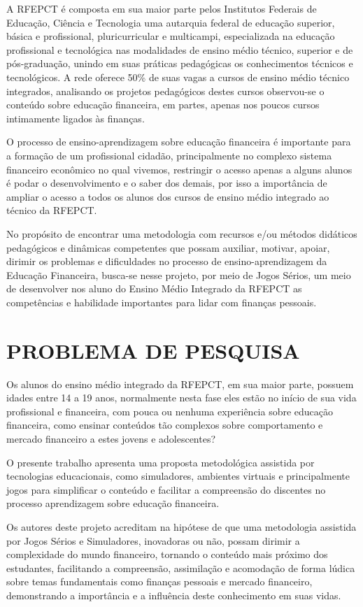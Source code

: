 A RFEPCT é composta em sua maior parte pelos Institutos Federais de Educação, Ciência e Tecnologia uma autarquia federal de educação superior, básica e profissional, pluricurricular e multicampi, especializada na educação profissional e tecnológica nas modalidades de ensino médio técnico, superior e de pós-graduação, unindo em suas práticas pedagógicas os conhecimentos técnicos e tecnológicos. A rede oferece 50\% de suas vagas a cursos de ensino médio técnico integrados, analisando os projetos pedagógicos destes cursos observou-se o conteúdo sobre educação financeira, em partes, apenas nos poucos cursos intimamente ligados às finanças.

O processo de ensino-aprendizagem sobre educação financeira é importante para a formação de um profissional cidadão, principalmente no complexo sistema financeiro econômico no qual vivemos, restringir o acesso apenas a alguns alunos é podar o desenvolvimento e o saber dos demais, por isso a importância de ampliar o acesso a todos os alunos dos cursos de ensino médio integrado ao técnico da RFEPCT.

No propósito de encontrar uma metodologia com recursos e/ou métodos didáticos pedagógicos e dinâmicas competentes que possam auxiliar, motivar, apoiar, dirimir os problemas e dificuldades no processo de ensino-aprendizagem da Educação Financeira, busca-se nesse projeto, por meio de Jogos Sérios, um meio de desenvolver nos aluno do Ensino Médio Integrado da RFEPCT as competências e habilidade importantes para lidar com finanças pessoais.

\section{PROBLEMA DE PESQUISA}
Os alunos do ensino médio integrado da RFEPCT, em sua maior parte, possuem idades entre 14 a 19 anos, normalmente nesta fase eles estão no início de sua vida profissional e financeira, com pouca ou nenhuma experiência sobre educação financeira, como ensinar conteúdos tão complexos sobre comportamento e mercado financeiro a estes jovens e adolescentes?

O presente trabalho apresenta uma proposta metodológica assistida por tecnologias educacionais, como simuladores, ambientes virtuais e principalmente jogos para simplificar o conteúdo e facilitar a compreensão do discentes no processo aprendizagem sobre educação financeira.

Os autores deste projeto acreditam na hipótese de que uma metodologia assistida por Jogos Sérios e Simuladores, inovadoras ou não, possam dirimir a complexidade do mundo financeiro, tornando o conteúdo mais próximo dos estudantes, facilitando a compreensão, assimilação e acomodação de forma lúdica sobre temas fundamentais como finanças pessoais e mercado financeiro, demonstrando a importância e a influência deste conhecimento em suas vidas.

